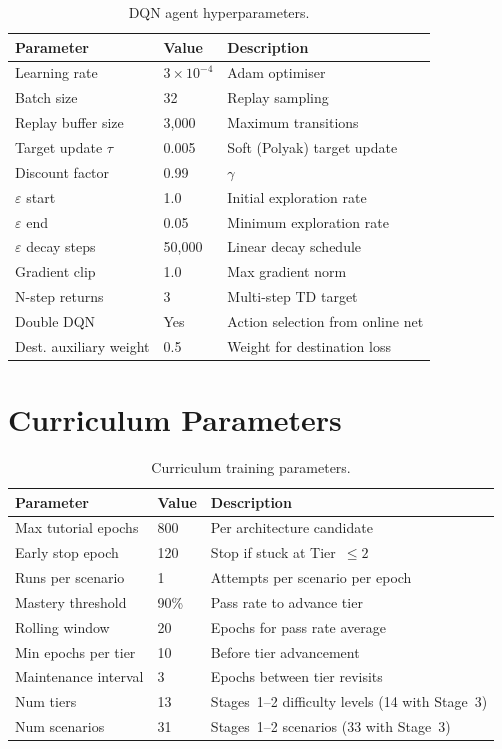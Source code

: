 \begin{table}[H]
\centering
\caption{DQN agent hyperparameters.}
\label{tab:hyper:agent}
\begin{tabular}{l l l}
\toprule
\textbf{Parameter} & \textbf{Value} & \textbf{Description} \\
\midrule
Learning rate       & $3 \times 10^{-4}$ & Adam optimiser \\
Batch size          & 32     & Replay sampling \\
Replay buffer size  & 3{,}000 & Maximum transitions \\
Target update $\tau$ & 0.005  & Soft (Polyak) target update \\
Discount factor     & 0.99   & $\gamma$ \\
$\varepsilon$ start & 1.0    & Initial exploration rate \\
$\varepsilon$ end   & 0.05   & Minimum exploration rate \\
$\varepsilon$ decay steps & 50{,}000 & Linear decay schedule \\
Gradient clip       & 1.0    & Max gradient norm \\
N-step returns      & 3      & Multi-step TD target \\
Double DQN          & Yes    & Action selection from online net \\
Dest. auxiliary weight & 0.5 & Weight for destination loss \\
\bottomrule
\end{tabular}
\end{table}

\section{Curriculum Parameters}
\label{app:hyper:curriculum}

\begin{table}[H]
\centering
\caption{Curriculum training parameters.}
\label{tab:hyper:curriculum}
\begin{tabular}{l l l}
\toprule
\textbf{Parameter} & \textbf{Value} & \textbf{Description} \\
\midrule
Max tutorial epochs  & 800    & Per architecture candidate \\
Early stop epoch     & 120    & Stop if stuck at Tier~$\leq 2$ \\
Runs per scenario    & 1      & Attempts per scenario per epoch \\
Mastery threshold    & 90\%   & Pass rate to advance tier \\
Rolling window       & 20     & Epochs for pass rate average \\
Min epochs per tier  & 10     & Before tier advancement \\
Maintenance interval & 3      & Epochs between tier revisits \\
Num tiers            & 13     & Stages~1--2 difficulty levels (14 with Stage~3) \\
Num scenarios        & 31     & Stages~1--2 scenarios (33 with Stage~3) \\
\bottomrule
\end{tabular}
\end{table}

